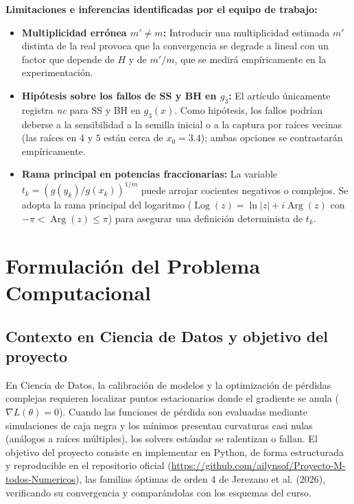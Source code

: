 \documentclass[10pt, a4paper]{article}
\begin{document}
\textbf{Limitaciones e inferencias identificadas por el equipo de trabajo:}
\begin{itemize}
    \item \textbf{Multiplicidad errónea $m' \neq m$:} Introducir una multiplicidad estimada $m'$ distinta de la real provoca que la convergencia se degrade a lineal con un factor que depende de $H$ y de $m'/m$, que se medirá empíricamente en la experimentación.
    \item \textbf{Hipótesis sobre los fallos de SS y BH en $g_3$:} El artículo únicamente registra \textit{nc} para SS y BH en $g_3(x)$. Como hipótesis, los fallos podrían deberse a la sensibilidad a la semilla inicial o a la captura por raíces vecinas (las raíces en $4$ y $5$ están cerca de $x_0 = 3.4$); ambas opciones se contrastarán empíricamente.
    \item \textbf{Rama principal en potencias fraccionarias:} La variable $t_k = (g(y_k)/g(x_k))^{1/m}$ puede arrojar cocientes negativos o complejos. Se adopta la rama principal del logaritmo ($\operatorname{Log}(z) = \ln|z| + i \operatorname{Arg}(z)$ con $-\pi < \operatorname{Arg}(z) \le \pi$) para asegurar una definición determinista de $t_k$.
\end{itemize}

\section{Formulación del Problema Computacional}

\subsection{Contexto en Ciencia de Datos y objetivo del proyecto}
En Ciencia de Datos, la calibración de modelos y la optimización de pérdidas complejas requieren localizar puntos estacionarios donde el gradiente se anula ($\nabla L(\theta) = 0$). Cuando las funciones de pérdida son evaluadas mediante simulaciones de caja negra y los mínimos presentan curvaturas casi nulas (análogos a raíces múltiples), los solvers estándar se ralentizan o fallan. El objetivo del proyecto consiste en implementar en Python, de forma estructurada y reproducible en el repositorio oficial (\url{https://github.com/ailynsof/Proyecto-M-todos-Numericos}), las familias óptimas de orden 4 de Jerezano et al. (2026), verificando su convergencia y comparándolas con los esquemas del curso.
\end{document}
